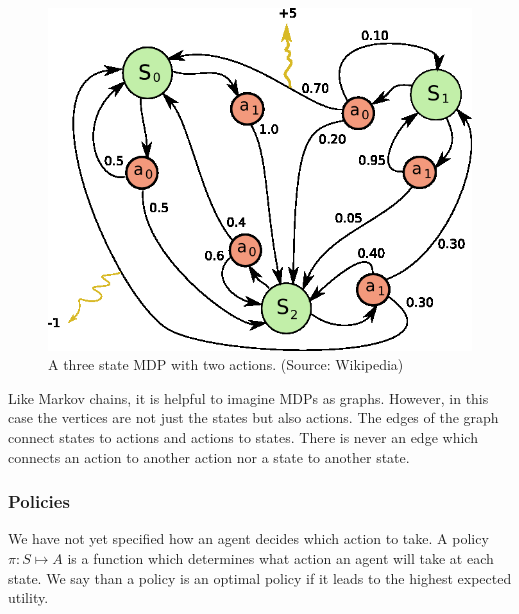 \documentclass[tog]{acmsiggraph}
\begin{document}
\begin{figure}[h]
  \centering
  \def\svgwidth{\columnwidth}
  \includegraphics[width=\columnwidth]{MDP.png}
  \caption{A three state MDP with two actions. (Source: Wikipedia)}
  \label{fig:markovDecisionProcess}
\end{figure}

Like Markov chains, it is helpful to imagine MDPs as graphs. However, in this case the vertices 
are not just the states but also actions. The edges of the graph connect states to actions 
and actions to states. There is never an edge which connects an action to another action nor 
a state to another state.

\subsubsection{Policies}
\label{sec:policies}

We have not yet specified how an agent decides which action to take. A policy 
$\pi : S \mapsto A$ is a function which determines what action an agent will take 
at each state. We say than a policy is an optimal policy if it leads to the highest expected utility.
\end{document}
